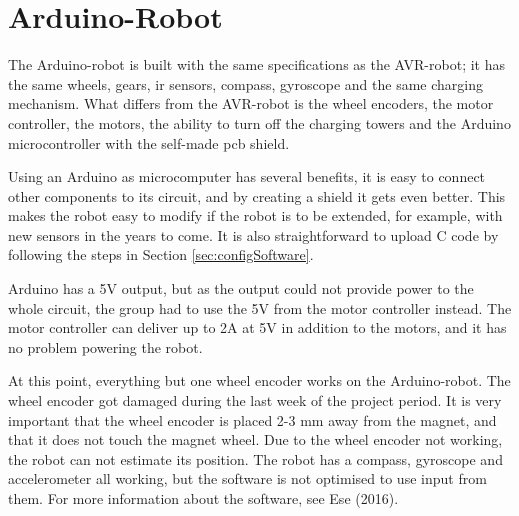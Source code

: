 \section{Arduino-Robot}
The Arduino-robot is built with the same specifications as the AVR-robot; it has the same wheels, gears, \acrshort{ir} sensors, compass, gyroscope and the same charging mechanism. What differs from the AVR-robot is the wheel encoders, the motor controller, the motors, the ability to turn off the charging towers and the Arduino microcontroller with the self-made \acrshort{pcb} shield. 

Using an Arduino as microcomputer has several benefits, it is easy to connect other components to its circuit, and by creating a shield it gets even better. This makes the robot easy to modify if the robot is to be extended, for example, with new sensors in the years to come. It is also straightforward to upload C code by following the steps in Section \ref{sec:configSoftware}. 

Arduino has a 5V output, but as the output could not provide power to the whole circuit, the group had to use the 5V from the motor controller instead. The motor controller can deliver up to 2A at 5V in addition to the motors, and it has no problem powering the robot.

At this point, everything but one wheel encoder works on the Arduino-robot. The wheel encoder got damaged during the last week of the project period. It is very important that the wheel encoder is placed 2-3 mm away from the magnet, and that it does not touch the magnet wheel. Due to the wheel encoder not working, the robot can not estimate its position. The robot has a compass, gyroscope and accelerometer all working, but the software is not optimised to use input from them. For more information about the software, see Ese (2016).
